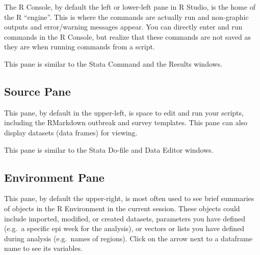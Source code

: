 \documentclass[
  letterpaper,
  DIV=11,
  numbers=noendperiod,
  oneside]{scrreprt}
\begin{document}
The R Console, by default the left or lower-left pane in R Studio, is
the home of the R ``engine''. This is where the commands are actually
run and non-graphic outputs and error/warning messages appear. You can
directly enter and run commands in the R Console, but realize that these
commands are not saved as they are when running commands from a script.

\begin{tcolorbox}[enhanced jigsaw, coltitle=black, opacityback=0, title=\textcolor{quarto-callout-tip-color}{\faLightbulb}\hspace{0.5em}{Tip}, toprule=.15mm, bottomtitle=1mm, colbacktitle=quarto-callout-tip-color!10!white, colframe=quarto-callout-tip-color-frame, left=2mm, opacitybacktitle=0.6, bottomrule=.15mm, arc=.35mm, toptitle=1mm, colback=white, titlerule=0mm, breakable, leftrule=.75mm, rightrule=.15mm]

This pane is similar to the Stata Command and the Results windows.

\end{tcolorbox}

\subsection{Source Pane}

This pane, by default in the upper-left, is space to edit and run your
scripts, including the RMarkdown outbreak and survey templates. This
pane can also display datasets (data frames) for viewing.

\begin{tcolorbox}[enhanced jigsaw, coltitle=black, opacityback=0, title=\textcolor{quarto-callout-tip-color}{\faLightbulb}\hspace{0.5em}{Tip}, toprule=.15mm, bottomtitle=1mm, colbacktitle=quarto-callout-tip-color!10!white, colframe=quarto-callout-tip-color-frame, left=2mm, opacitybacktitle=0.6, bottomrule=.15mm, arc=.35mm, toptitle=1mm, colback=white, titlerule=0mm, breakable, leftrule=.75mm, rightrule=.15mm]

This pane is similar to the Stata Do-file and Data Editor windows.

\end{tcolorbox}

\subsection{Environment Pane}

This pane, by default the upper-right, is most often used to see brief
summaries of objects in the R Environment in the current session. These
objects could include imported, modified, or created datasets,
parameters you have defined (e.g.~a specific epi week for the analysis),
or vectors or lists you have defined during analysis (e.g.~names of
regions). Click on the arrow next to a dataframe name to see its
variables.
\end{document}
